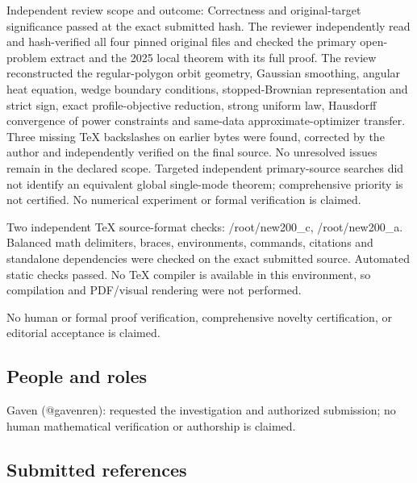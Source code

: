 \documentclass[11pt]{article}
\begin{document}
Independent review scope and outcome: Correctness and original-target significance passed at the exact submitted hash. The reviewer independently read and hash-verified all four pinned original files and checked the primary open-problem extract and the 2025 local theorem with its full proof. The review reconstructed the regular-polygon orbit geometry, Gaussian smoothing, angular heat equation, wedge boundary conditions, stopped-Brownian representation and strict sign, exact profile-objective reduction, strong uniform law, Hausdorff convergence of power constraints and same-data approximate-optimizer transfer. Three missing TeX backslashes on earlier bytes were found, corrected by the author and independently verified on the final source. No unresolved issues remain in the declared scope. Targeted independent primary-source searches did not identify an equivalent global single-mode theorem; comprehensive priority is not certified. No numerical experiment or formal verification is claimed.

Two independent TeX source-format checks: /root/new200\_c, /root/new200\_a. Balanced math delimiters, braces, environments, commands, citations and standalone dependencies were checked on the exact submitted source. Automated static checks passed. No TeX compiler is available in this environment, so compilation and PDF/visual rendering were not performed.

No human or formal proof verification, comprehensive novelty certification, or editorial acceptance is claimed.

\subsection{People and roles}

Gaven (@gavenren): requested the investigation and authorized submission; no human mathematical verification or authorship is claimed.

\subsection{Submitted references}
\end{document}
